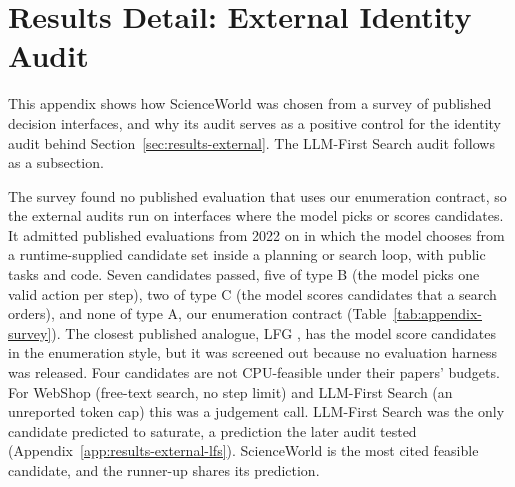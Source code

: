 \section{Results Detail: External Identity Audit}
\label{app:results-external}

This appendix shows how ScienceWorld was chosen from a survey of published decision interfaces, and why its audit serves as a positive control for the identity audit behind Section~\ref{sec:results-external}. The LLM-First Search audit follows as a subsection.

The survey found no published evaluation that uses our enumeration contract, so the external audits run on interfaces where the model picks or scores candidates. It admitted published evaluations from 2022 on in which the model chooses from a runtime-supplied candidate set inside a planning or search loop, with public tasks and code. Seven candidates passed, five of type B (the model picks one valid action per step), two of type C (the model scores candidates that a search orders), and none of type A, our enumeration contract (Table~\ref{tab:appendix-survey}). The closest published analogue, LFG \citep{shah2023lfg}, has the model score candidates in the enumeration style, but it was screened out because no evaluation harness was released. Four candidates are not CPU-feasible under their papers' budgets. For WebShop (free-text search, no step limit) and LLM-First Search (an unreported token cap) this was a judgement call. LLM-First Search was the only candidate predicted to saturate, a prediction the later audit tested (Appendix~\ref{app:results-external-lfs}). ScienceWorld is the most cited feasible candidate, and the runner-up shares its prediction.

